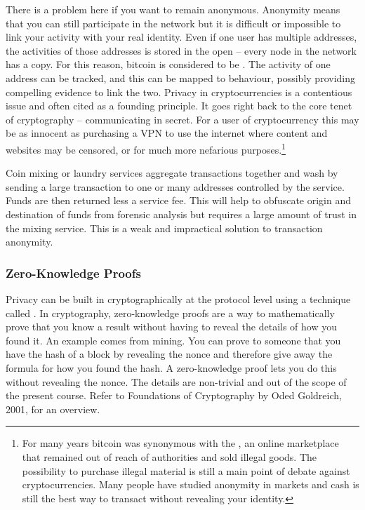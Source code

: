 There is a problem here if you want to remain anonymous. Anonymity means that you can still participate in the network but it is difficult or impossible to link your activity with your real identity. Even if one user has multiple addresses, the activities of those addresses is stored in the open -- every node in the network has a copy. For this reason, bitcoin is considered to be . The activity of one address can be tracked, and this can be mapped to behaviour, possibly providing compelling evidence to link the two. Privacy in cryptocurrencies is a contentious issue and often cited as a founding principle. It goes right back to the core tenet of cryptography -- communicating in secret. For a user of cryptocurrency this may be as innocent as purchasing a VPN to use the internet where content and websites may be censored, or for much more nefarious purposes.\footnote{For many years bitcoin was synonymous with the , an online marketplace that remained out of reach of authorities and sold illegal goods. The possibility to purchase illegal material is still a main point of debate against cryptocurrencies. Many people have studied anonymity in markets and cash is still the best way to transact without revealing your identity.}

Coin mixing or laundry services aggregate transactions together and wash by sending a large transaction to one or many addresses controlled by the service. Funds are then returned less a service fee. This will help to obfuscate origin and destination of funds from forensic analysis but requires a large amount of trust in the mixing service. This is a weak and impractical solution to transaction anonymity. 

\subsubsection*{Zero-Knowledge Proofs}
Privacy can be built in cryptographically at the protocol level using a technique called . In cryptography, zero-knowledge proofs are a way to mathematically prove that you know a result without having to reveal the details of how you found it. An example comes from mining. You can prove to someone that you have the hash of a block by revealing the nonce and therefore give away the formula for how you found the hash. A zero-knowledge proof lets you do this without revealing the nonce. The details are non-trivial and out of the scope of the present course. Refer to Foundations of Cryptography by Oded Goldreich, 2001, for an overview.

